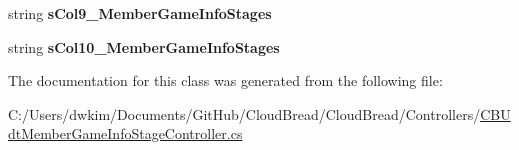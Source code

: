 \begin{DoxyCompactItemize}
\item 
string {\bfseries s\+Col9\+\_\+\+Member\+Game\+Info\+Stages}\hypertarget{class_cloud_bread_1_1_controllers_1_1_c_b_udt_member_game_info_stage_controller_1_1_input_params_a0ae87a7bc2fe3df244e8ccd1305e9122}{}\label{class_cloud_bread_1_1_controllers_1_1_c_b_udt_member_game_info_stage_controller_1_1_input_params_a0ae87a7bc2fe3df244e8ccd1305e9122}

\item 
string {\bfseries s\+Col10\+\_\+\+Member\+Game\+Info\+Stages}\hypertarget{class_cloud_bread_1_1_controllers_1_1_c_b_udt_member_game_info_stage_controller_1_1_input_params_a3fe7595d5a83736324b535a63d628285}{}\label{class_cloud_bread_1_1_controllers_1_1_c_b_udt_member_game_info_stage_controller_1_1_input_params_a3fe7595d5a83736324b535a63d628285}

\end{DoxyCompactItemize}


The documentation for this class was generated from the following file\+:\begin{DoxyCompactItemize}
\item 
C\+:/\+Users/dwkim/\+Documents/\+Git\+Hub/\+Cloud\+Bread/\+Cloud\+Bread/\+Controllers/\hyperlink{_c_b_udt_member_game_info_stage_controller_8cs}{C\+B\+Udt\+Member\+Game\+Info\+Stage\+Controller.\+cs}\end{DoxyCompactItemize}
